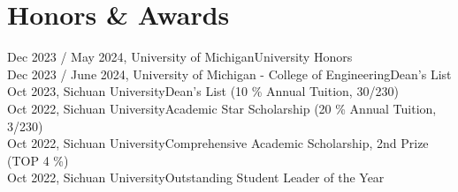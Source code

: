 \documentclass[letter,12pt]{article}
\begin{document}



\section{Honors \& Awards}
Dec 2023 / May 2024, University of Michigan\hfill University Honors\\
Dec 2023 / June 2024, University of Michigan - College of Engineering\hfill Dean's List\\
Oct 2023, Sichuan University\hfill Dean's List (10 \% Annual Tuition, 30/230)\\
Oct 2022, Sichuan University\hfill Academic Star Scholarship (20 \% Annual Tuition, 3/230)\\
Oct 2022, Sichuan University\hfill Comprehensive Academic Scholarship, 2nd Prize (TOP 4 \%)\\
Oct 2022, Sichuan University\hfill Outstanding Student Leader of the Year\\
\end{document}

